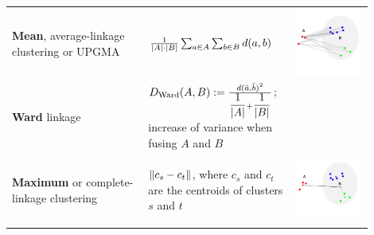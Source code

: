 \documentclass[11pt]{article}
\theoremstyle{definition}
\DeclarePairedDelimiter\abs{\lvert}{\rvert}
\DeclarePairedDelimiter\norm{\lVert}{\rVert}
\begin{document}
\begin{tabularx}{\linewidth}{m{0.35\linewidth} m{0.35\linewidth} m{0.2\linewidth}}
	\textbf{Mean}, average-linkage clustering or UPGMA & $ \frac{1}{\abs{A}\cdot\abs{B}}\sum_{a\in A}\sum_{b\in B} d(a,b) $ & \includegraphics[width=\linewidth]{img/average_linkage}\\
	\textbf{Ward} linkage & $D_{\text{Ward}}(A,B) := \frac{d(\bar{a},\bar{b})^2}{\dfrac{1}{\abs{A}} + \dfrac{1}{\abs{B}}}$; increase of variance when fusing $A$ and $B$ & \\
	\textbf{Maximum} or complete-linkage clustering & $ \norm{c_s - c_t} $, where $c_s$ and $c_t$ are the centroids of clusters $s$ and $t$ & \includegraphics[width=\linewidth]{img/centroid_linkage}
\end{tabularx}
\end{document}
